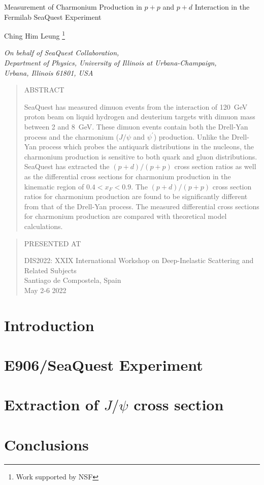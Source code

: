 \documentclass[10pt, paper=a4,]{article}
\def\Title#1{\begin{center} {\Large #1 } \end{center}}
\def\Author#1{\begin{center}{ \sc #1} \end{center}}
\def\Address#1{\begin{center}{ \it #1} \end{center}}
\newcommand\pubblock{\rightline{\begin{tabular}{l} Proceedings of DIS2022\\ 
         \pubdate  \end{tabular}}}
\newenvironment{Abstract}{\begin{quotation} \begin{center} 
             \large ABSTRACT \end{center}\bigskip 
      \begin{large}}{\end{large}\end{quotation}}
\newenvironment{Presented}{\begin{quotation} \begin{center} 
             PRESENTED AT\end{center}\bigskip 
      \begin{center}\begin{large}}{\end{large}\end{center} \end{quotation}}
\newcommand\pubdate{\today}
\def\affiliation{
On behalf of SeaQuest Collaboration, \\
Department of Physics, University of Illinois at Urbana-Champaign, \\Urbana, Illinois 61801, USA}
\def\support{\footnote{Work supported by NSF}}
\newcommand{\conference}{DIS2022: XXIX International Workshop on Deep-Inelastic Scattering and Related Subjects\\
Santiago de Compostela, Spain\\
May 2-6 2022}
\begin{document}
\large
\begin{titlepage}
\pubblock


\vfill
\Title{Measurement of Charmonium Production in $p + p$ and $p + d$ Interaction in the Fermilab SeaQuest Experiment}
\vfill

\Author{Ching Him Leung \support}
\Address{\affiliation}
\vfill

\begin{Abstract}
SeaQuest has measured dimuon events from the interaction of \SI{120}{\GeV} proton beam on liquid hydrogen and deuterium targets with dimuon mass between \num{2} and \SI{8}{\GeV}. These dimuon events contain both the Drell-Yan process and the charmonium ($J/\psi$ and $\psi^\prime$) production. Unlike the Drell-Yan process which probes the antiquark distributions in the nucleons, the charmonium production is sensitive to both quark and gluon distributions. SeaQuest has extracted the $(p+d)/(p+p)$ cross section ratios as well as the differential cross sections for charmonium production in the kinematic region of $0.4 < x_F < 0.9$. The $(p+d)/(p+p)$ cross section ratios for charmonium production are found to be significantly different from that of the Drell-Yan process. The measured differential cross sections for charmonium production are compared with theoretical model calculations.
\end{Abstract}

\vfill

\begin{Presented}
\conference
\end{Presented}
\vfill
\end{titlepage}

\setcounter{footnote}{0}
\normalsize 


\section{Introduction}
\label{intro}

\section{E906/SeaQuest Experiment}

\section{Extraction of $J/\psi$ cross section}


\section{Conclusions}


\printbibliography[heading=bibintoc,title={References}]
\end{document}
